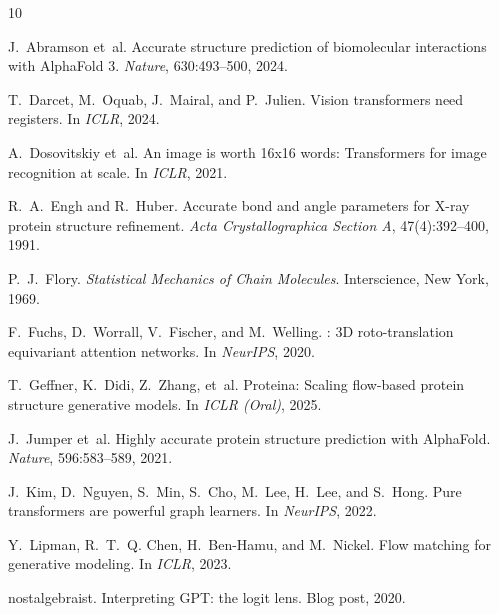 \documentclass{article}
\begin{document}

\begin{thebibliography}{10}

J.~Abramson et~al.
\newblock Accurate structure prediction of biomolecular interactions with {AlphaFold} 3.
\newblock \emph{Nature}, 630:493--500, 2024.

T.~Darcet, M.~Oquab, J.~Mairal, and P.~Julien.
\newblock Vision transformers need registers.
\newblock In \emph{ICLR}, 2024.

A.~Dosovitskiy et~al.
\newblock An image is worth 16x16 words: Transformers for image recognition at scale.
\newblock In \emph{ICLR}, 2021.

R.~A.~Engh and R.~Huber.
\newblock Accurate bond and angle parameters for {X}-ray protein structure refinement.
\newblock \emph{Acta Crystallographica Section A}, 47(4):392--400, 1991.

P.~J.~Flory.
\newblock \emph{Statistical Mechanics of Chain Molecules}.
\newblock Interscience, New York, 1969.

F.~Fuchs, D.~Worrall, V.~Fischer, and M.~Welling.
: 3{D} roto-translation equivariant attention networks.
\newblock In \emph{NeurIPS}, 2020.

T.~Geffner, K.~Didi, Z.~Zhang, et~al.
\newblock Proteina: Scaling flow-based protein structure generative models.
\newblock In \emph{ICLR (Oral)}, 2025.

J.~Jumper et~al.
\newblock Highly accurate protein structure prediction with {AlphaFold}.
\newblock \emph{Nature}, 596:583--589, 2021.

J.~Kim, D.~Nguyen, S.~Min, S.~Cho, M.~Lee, H.~Lee, and S.~Hong.
\newblock Pure transformers are powerful graph learners.
\newblock In \emph{NeurIPS}, 2022.

Y.~Lipman, R.~T.~Q. Chen, H.~Ben-Hamu, and M.~Nickel.
\newblock Flow matching for generative modeling.
\newblock In \emph{ICLR}, 2023.

nostalgebraist.
\newblock Interpreting {GPT}: the logit lens.
\newblock Blog post, 2020.


\end{thebibliography}
\end{document}
